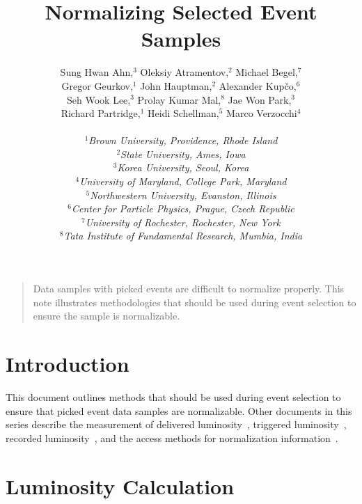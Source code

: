 \documentclass[12pt]{article}
\begin{document}
\title{Normalizing Selected Event Samples}
\author{Sung Hwan Ahn,$^3$ 
	Oleksiy Atramentov,$^2$ 
	Michael Begel,$^7$ \\
	Gregor Geurkov,$^1$ 
	John Hauptman,$^2$ 
	Alexander Kup\v{c}o,$^6$ \\
	Seh Wook Lee,$^3$ 
	Prolay Kumar Mal,$^8$ 
	Jae Won Park,$^3$ \\
	Richard Partridge,$^1$ 
	Heidi Schellman,$^5$ 
	Marco Verzocchi$^4$
\\
\\ $^1${\it\small Brown University, Providence, Rhode Island}
\\ $^2${\it\small State University, Ames, Iowa}
\\ $^3${\it\small Korea University, Seoul, Korea}
\\ $^4${\it\small University of Maryland, College Park, Maryland}
\\ $^5${\it\small Northwestern University, Evanston, Illinois}
\\ $^6${\it\small Center for Particle Physics, Prague, Czech Republic}
\\ $^7${\it\small University of Rochester, Rochester, New York}
\\ $^8${\it\small Tata Institute of Fundamental Research, Mumbia, India}
}
\maketitle
\thispagestyle{myheadings}

\begin{quote}
Data samples with picked events are difficult to normalize properly.
This note illustrates methodologies that should be used during event
selection to ensure the sample is normalizable.
\end{quote}

\section{Introduction}

This document outlines methods that should be used during event
selection to ensure that picked event data samples are normalizable.
Other documents in this series describe the measurement of delivered
luminosity~\cite{3970}, triggered luminosity~\cite{3971}, recorded
luminosity~\cite{3972}, and the access methods for normalization
information~\cite{3937,3969}.

\section{Luminosity Calculation}
\end{document}
